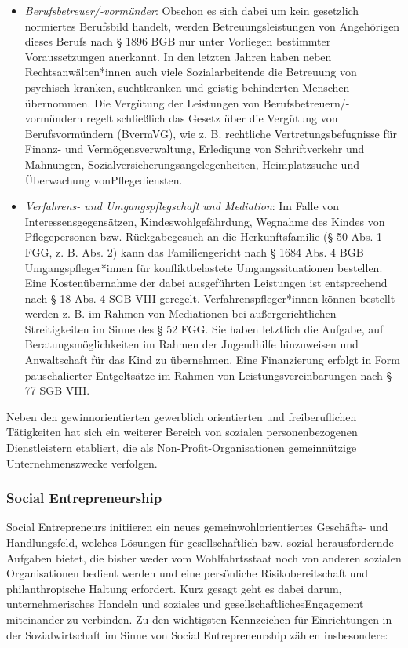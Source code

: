 \documentclass[
  letterpaper,
]{book}
\begin{document}
\begin{itemize}
\item
  \emph{Berufsbetreuer/-vormünder}: Obschon es sich dabei um kein
  gesetzlich normiertes Berufsbild handelt, werden Betreuungsleistungen
  von Angehörigen dieses Berufs nach § 1896 BGB nur unter Vorliegen
  bestimmter Voraussetzungen anerkannt. In den letzten Jahren haben
  neben Rechtsanwälten*innen auch viele Sozialarbeitende die Betreuung
  von psychisch kranken, suchtkranken und geistig behinderten Menschen
  übernommen. Die Vergütung der Leistungen von
  Berufsbetreuern/-vormündern regelt schließlich das Gesetz über die
  Vergütung von Berufsvormündern (BvermVG), wie z. B. rechtliche
  Vertretungsbefugnisse für Finanz- und Vermögensverwaltung, Erledigung
  von Schriftverkehr und Mahnungen, Sozialversicherungsangelegenheiten,
  Heimplatzsuche und Überwachung vonPflegediensten.
\item
  \emph{Verfahrens- und Umgangspflegschaft und Mediation}: Im Falle von
  Interessensgegensätzen, Kindeswohlgefährdung, Wegnahme des Kindes von
  Pflegepersonen bzw. Rückgabegesuch an die Herkunftsfamilie (§ 50 Abs.
  1 FGG, z. B. Abs. 2) kann das Familiengericht nach § 1684 Abs. 4 BGB
  Umgangspfleger*innen für konfliktbelastete Umgangssituationen
  bestellen. Eine Kostenübernahme der dabei ausgeführten Leistungen ist
  entsprechend nach § 18 Abs. 4 SGB VIII geregelt.
  Verfahrenspfleger*innen können bestellt werden z. B. im Rahmen von
  Mediationen bei außergerichtlichen Streitigkeiten im Sinne des § 52
  FGG. Sie haben letztlich die Aufgabe, auf Beratungsmöglichkeiten im
  Rahmen der Jugendhilfe hinzuweisen und Anwaltschaft für das Kind zu
  übernehmen. Eine Finanzierung erfolgt in Form pauschalierter
  Entgeltsätze im Rahmen von Leistungsvereinbarungen nach § 77 SGB VIII.
\end{itemize}

Neben den gewinnorientierten gewerblich orientierten und freiberuflichen
Tätigkeiten hat sich ein weiterer Bereich von sozialen personenbezogenen
Dienstleistern etabliert, die als Non-Profit-Organisationen
gemeinnützige Unternehmenszwecke verfolgen.

\subsubsection{Social
Entrepreneurship}\label{existenzgruendungsfeld-social-entrepreneurship}

Social Entrepreneurs initiieren ein neues gemeinwohlorientiertes
Geschäfts- und Handlungsfeld, welches Lösungen für gesellschaftlich bzw.
sozial herausfordernde Aufgaben bietet, die bisher weder vom
Wohlfahrtsstaat noch von anderen sozialen Organisationen bedient werden
und eine persönliche Risikobereitschaft und philanthropische Haltung
erfordert. Kurz gesagt geht es dabei darum, unternehmerisches Handeln
und soziales und gesellschaftlichesEngagement miteinander zu verbinden.
Zu den wichtigsten Kennzeichen für Einrichtungen in der Sozialwirtschaft
im Sinne von Social Entrepreneurship zählen insbesondere:
\end{document}
